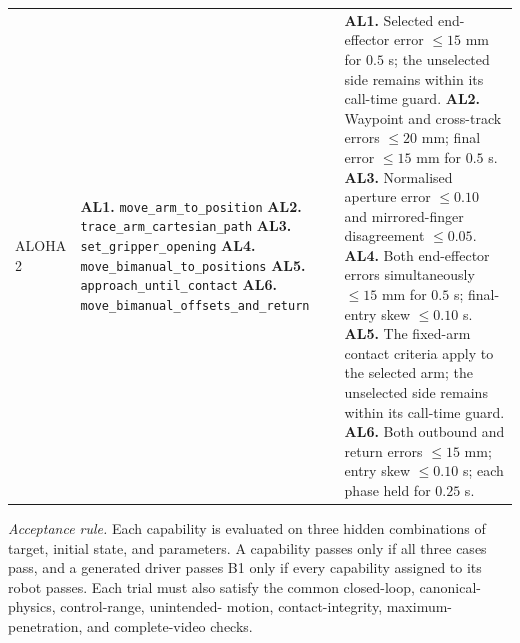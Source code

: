 \begin{longtable}{@{}>{\raggedright\arraybackslash}p{}
                        >{\raggedright\arraybackslash}p{}
                        >{\raggedright\arraybackslash}p{}@{}}
ALOHA 2
&
\textbf{AL1.} \texttt{move\_arm\_to\_position}\newline
\textbf{AL2.} \texttt{trace\_arm\_cartesian\_path}\newline
\textbf{AL3.} \texttt{set\_gripper\_opening}\newline
\textbf{AL4.} \texttt{move\_bimanual\_to\_positions}\newline
\textbf{AL5.} \texttt{approach\_until\_contact}\newline
\textbf{AL6.} \texttt{move\_bimanual\_offsets\_and\_return}
&
\textbf{AL1.} Selected end-effector error $\leq 15$ mm for $0.5$ s;
the unselected side remains within its call-time guard.\newline
\textbf{AL2.} Waypoint and cross-track errors $\leq 20$ mm; final error
$\leq 15$ mm for $0.5$ s.\newline
\textbf{AL3.} Normalised aperture error $\leq 0.10$ and mirrored-finger
disagreement $\leq 0.05$.\newline
\textbf{AL4.} Both end-effector errors simultaneously $\leq 15$ mm for
$0.5$ s; final-entry skew $\leq 0.10$ s.\newline
\textbf{AL5.} The fixed-arm contact criteria apply to the selected arm;
the unselected side remains within its call-time guard.\newline
\textbf{AL6.} Both outbound and return errors $\leq 15$ mm; entry skew
$\leq 0.10$ s; each phase held for $0.25$ s.
\\

\end{longtable}

\noindent\footnotesize\textit{Acceptance rule.} Each capability is evaluated
on three hidden combinations of target, initial state, and parameters. A
capability passes only if all three cases pass, and a generated driver passes
B1 only if every capability assigned to its robot passes. Each trial must also
satisfy the common closed-loop, canonical-physics, control-range, unintended-
motion, contact-integrity, maximum-penetration, and complete-video checks.

\endgroup
